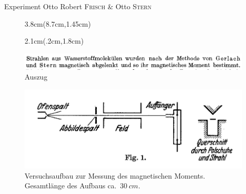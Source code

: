 \documentclass[t,9pt]{beamer}
\newcommand{\highlight}[3]{ \begin{textblock*}{#1}(#2,#3) \begin{tcolorbox} [enhanced,opacityfill=.1,colback=blue] \end{tcolorbox} \end{textblock*} } %
\begin{document}
        \begin{frame}{Experiment Otto Robert \textsc{Frisch} \& Otto \textsc{Stern}} 
                \begin{figure}
                        \highlight{3.8cm}{8.7cm}{1.45cm}
                        \highlight{2.1cm}{.2cm}{1.8cm}
                        \includegraphics[width=\textwidth]{prosi_nach_methode_stern_gerlach.png}
                        \caption*{Auszug \cite{FrischStern1933}}
                \end{figure} 
                \begin{figure}
                        \includegraphics[width=.8\textwidth]{prosi_versuchsaufbau_mag_moment.png}
                        \caption*{Versuchsaufbau zur Messung des magnetischen Moments. Gesamtlänge des Aufbaus ca.\ $\SI{30}{cm}$.\cite{FrischStern1933}}
                \end{figure}
        \end{frame}
\end{document}
